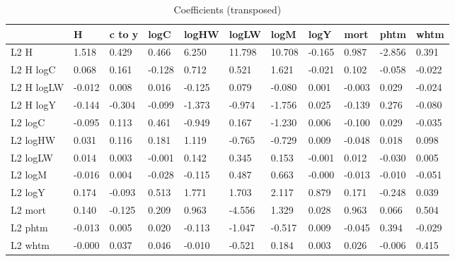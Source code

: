 \begin{table}[htbp]
\caption{\label{clabel} Coefficients (transposed)}\centering\medskip
\begin{tabular}{lllllllllll} \hline \hline
 & H  & c to y  & logC  & logHW  & logLW  & logM  & logY  & mort  & phtm  & whtm  \\  \hline 
L2 H &     1.518 &     0.429 &     0.466 &     6.250 &    11.798 &    10.708 &    -0.165 &     0.987 &    -2.856 &     0.391 \\  
L2 H logC &     0.068 &     0.161 &    -0.128 &     0.712 &     0.521 &     1.621 &    -0.021 &     0.102 &    -0.058 &    -0.022 \\  
L2 H logLW &    -0.012 &     0.008 &     0.016 &    -0.125 &     0.079 &    -0.080 &     0.001 &    -0.003 &     0.029 &    -0.024 \\  
L2 H logY &    -0.144 &    -0.304 &    -0.099 &    -1.373 &    -0.974 &    -1.756 &     0.025 &    -0.139 &     0.276 &    -0.080 \\  
L2 logC &    -0.095 &     0.113 &     0.461 &    -0.949 &     0.167 &    -1.230 &     0.006 &    -0.100 &     0.029 &    -0.035 \\  
L2 logHW &     0.031 &     0.116 &     0.181 &     1.119 &    -0.765 &    -0.729 &     0.009 &    -0.048 &     0.018 &     0.098 \\  
L2 logLW &     0.014 &     0.003 &    -0.001 &     0.142 &     0.345 &     0.153 &    -0.001 &     0.012 &    -0.030 &     0.005 \\  
L2 logM &    -0.016 &     0.004 &    -0.028 &    -0.115 &     0.487 &     0.663 &    -0.000 &    -0.013 &    -0.010 &    -0.051 \\  
L2 logY &     0.174 &    -0.093 &     0.513 &     1.771 &     1.703 &     2.117 &     0.879 &     0.171 &    -0.248 &     0.039 \\  
L2 mort &     0.140 &    -0.125 &     0.209 &     0.963 &    -4.556 &     1.329 &     0.028 &     0.963 &     0.066 &     0.504 \\  
L2 phtm &    -0.013 &     0.005 &     0.020 &    -0.113 &    -1.047 &    -0.517 &     0.009 &    -0.045 &     0.394 &    -0.029 \\  
L2 whtm &    -0.000 &     0.037 &     0.046 &    -0.010 &    -0.521 &     0.184 &     0.003 &     0.026 &    -0.006 &     0.415 \\  

\end{tabular}
\end{table}
